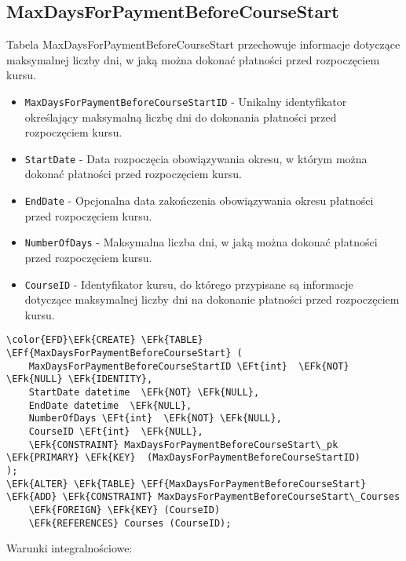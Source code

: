 \documentclass[11pt]{article}
\newcommand{\EFk}[1]{\textcolor{EFk}{\textbf{#1}}} %
\newcommand{\EFf}[1]{\textcolor{EFf}{#1}} %
\newcommand{\EFt}[1]{\textcolor{EFt}{\textbf{#1}}} %
\begin{document}
\subsection{MaxDaysForPaymentBeforeCourseStart}
\label{sec:org84eb07e}
Tabela MaxDaysForPaymentBeforeCourseStart przechowuje informacje dotyczące maksymalnej liczby dni, w jaką można dokonać płatności przed rozpoczęciem kursu.
\begin{itemize}
\item \texttt{MaxDaysForPaymentBeforeCourseStartID} - Unikalny identyfikator określający maksymalną liczbę dni do dokonania płatności przed rozpoczęciem kursu.
\item \texttt{StartDate} - Data rozpoczęcia obowiązywania okresu, w którym można dokonać płatności przed rozpoczęciem kursu.
\item \texttt{EndDate} - Opcjonalna data zakończenia obowiązywania okresu płatności przed rozpoczęciem kursu.
\item \texttt{NumberOfDays} - Maksymalna liczba dni, w jaką można dokonać płatności przed rozpoczęciem kursu.
\item \texttt{CourseID} - Identyfikator kursu, do którego przypisane są informacje dotyczące maksymalnej liczby dni na dokonanie płatności przed rozpoczęciem kursu.
\end{itemize}
\begin{Code}
\begin{Verbatim}
\color{EFD}\EFk{CREATE} \EFk{TABLE} \EFf{MaxDaysForPaymentBeforeCourseStart} (
    MaxDaysForPaymentBeforeCourseStartID \EFt{int}  \EFk{NOT} \EFk{NULL} \EFk{IDENTITY},
    StartDate datetime  \EFk{NOT} \EFk{NULL},
    EndDate datetime  \EFk{NULL},
    NumberOfDays \EFt{int}  \EFk{NOT} \EFk{NULL},
    CourseID \EFt{int}  \EFk{NULL},
    \EFk{CONSTRAINT} MaxDaysForPaymentBeforeCourseStart\_pk \EFk{PRIMARY} \EFk{KEY}  (MaxDaysForPaymentBeforeCourseStartID)
);
\EFk{ALTER} \EFk{TABLE} \EFf{MaxDaysForPaymentBeforeCourseStart} \EFk{ADD} \EFk{CONSTRAINT} MaxDaysForPaymentBeforeCourseStart\_Courses
    \EFk{FOREIGN} \EFk{KEY} (CourseID)
    \EFk{REFERENCES} Courses (CourseID);
\end{Verbatim}
\end{Code}
Warunki integralnościowe:
\end{document}
